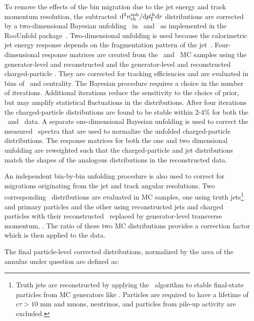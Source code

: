 
To remove the effects of the bin migration due to the jet energy and track momentum resolution, the subtracted $\mathrm{d}^2 \mbox{$n_{\mathrm{ch}}^{\mathrm{sub}}$} /\mathrm{d}\mbox{$p_{\mathrm{T}}^{\mathrm{ch}}$} \mathrm{d} r$ distributions are corrected by a two-dimensional Bayesian unfolding~\cite{DAgostini:1994zf} in \pttrk\ and \ptjet\ as implemented in the RooUnfold package~\cite{Adye:2011gm}. 
Two-dimensional unfolding is used because the calorimetric jet energy response depends on the fragmentation pattern of the jet~\cite{Aad:2011he}.
Four-dimensional response matrices are created from the \pp\ and \pbpb\ MC samples using the generator-level and reconstructed \ptjet and the generator-level and reconstructed charged-particle \pttrk.
They are corrected for tracking efficiencies and are evaluated in bins of \rvar\ and centrality.
The Bayesian procedure requires a choice in the number of iterations.
Additional iterations reduce the sensitivity to the choice of prior, but may amplify statistical fluctuations in the distributions.
After four iterations the charged-particle distributions are found to be stable within 2-4\% for both the \PbPb\ and \pp\ data.
A separate one-dimensional Bayesian unfolding is used to correct the measured \ptjet\ spectra that are used to normalize the unfolded charged-particle distributions.
The response matrices for both the one and two dimensional unfolding are reweighted such that the charged-particle and jet distributions match the shapes of the analogous distributions in the reconstructed data.

An independent bin-by-bin unfolding procedure is also used to correct for migrations originating from the jet and track angular resolutions.
Two corresponding \Dptr\ distributions are evaluated in MC samples, one using truth jets\footnote{Truth jets are reconstructed by applying the \antikt\ algorithm to stable final-state particles from MC generators like \PYTHIA. Particles are required to have a lifetime of $c\tau > 10$ mm and muons, neutrinos, and particles from pile-up activity are excluded.} and primary particles and the other using reconstructed jets and charged particles with their reconstructed \pt\ replaced by generator-level transverse momentum, \pTtrue.
The ratio of these two MC distributions provides a correction factor which is then applied to the data.

The final particle-level corrected distributions, normalized by the area of the annulus under question are defined as:


